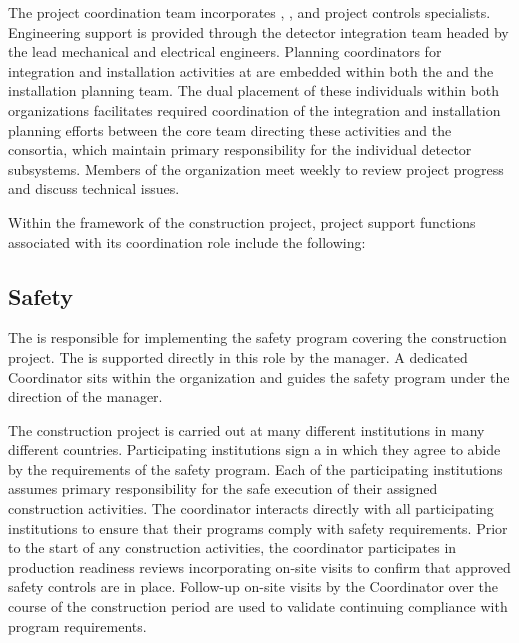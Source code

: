 The  project coordination team incorporates , 
, and project controls specialists.  Engineering support 
is provided through the  detector integration team 
headed by the lead  mechanical and electrical engineers.
Planning coordinators for integration and installation activities 
at  are embedded within both the  and the 
 installation planning team.  The dual placement of 
these individuals within both organizations facilitates required 
coordination of the integration and installation planning 
efforts between the core team directing these activities and the 
 consortia, which maintain primary responsibility for 
the individual detector subsystems.  Members of the  
organization meet weekly to review project progress and discuss 
technical issues. 
     
Within the framework of the   construction 
project,  project support functions associated with its 
coordination role include the following:

\subsection{Safety}

The  is responsible for implementing the safety program
covering the  construction project.  The 
is supported directly in this role by the  
manager.  A dedicated   Coordinator sits within
the  organization and guides the  safety program 
under the direction of the   manager.

The  construction project is carried out at many different
institutions in many different countries.  Participating institutions
sign a  in which they agree to abide
by the requirements of the  safety program.  Each of the
participating institutions assumes primary responsibility for the safe
execution of their assigned construction activities.  The 
 coordinator interacts directly with all participating
institutions to ensure that their programs comply with 
safety requirements.  Prior to the start of any construction 
activities, the   coordinator participates in 
production readiness reviews incorporating on-site visits to confirm 
that approved safety controls are in place.  Follow-up on-site visits 
by the   Coordinator over the course of the 
construction period are used to validate continuing compliance with
program requirements.

